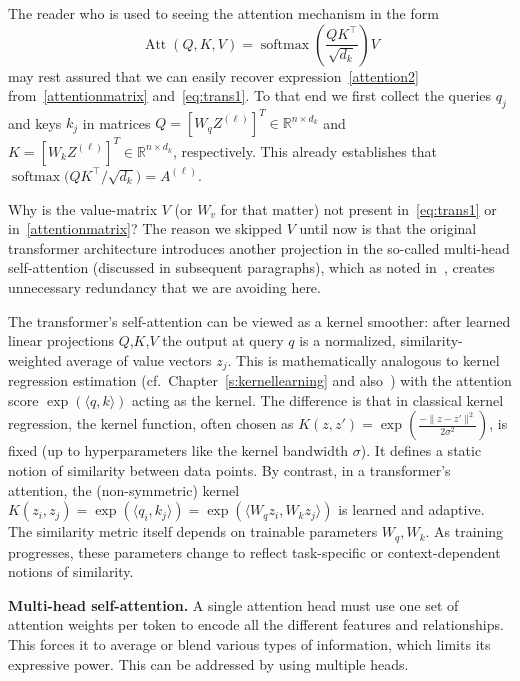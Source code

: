 The reader who is used to seeing the attention mechanism  in the form
\begin{equation}
    \label{attention2}
\operatorname{Att}(Q, K, V) = \operatorname{softmax} \left( \frac{QK^\top}{\sqrt{d_k}} \right)V
\end{equation}
may rest assured that  we can easily recover expression~\eqref{attention2} from~\eqref{attentionmatrix}
and~\eqref{eq:trans1}.
To that end we first collect the queries $q_j$ and keys $k_j$ in matrices $Q = [W_q Z^{(\ell)}]^T \in \mathbb{R}^{n \times d_k}$ and $K =  [W_k Z^{(\ell)}]^T \in \mathbb{R}^{n \times d_k}$, respectively.
This already establishes that $\operatorname{softmax} \big( QK^\top/\sqrt{d_k} \big) = A^{(\ell)}$.

Why is the value-matrix $V$ (or $W_v$ for that matter) not present in~\eqref{eq:trans1} or in~\eqref{attentionmatrix}? The reason we skipped $V$ until now is that the original transformer architecture introduces another projection in the so-called multi-head self-attention (discussed in subsequent paragraphs), which as noted in~\cite{turner2023introduction}, creates unnecessary redundancy that we are avoiding here.

\smallskip

The transformer's self-attention can be viewed as a kernel smoother: after learned linear projections 
$Q$,$K$,$V$ the output at query $q$
is a normalized, similarity-weighted average of value vectors $z_j$.  This is mathematically analogous to  kernel regression estimation (cf.~Chapter~\ref{s:kernellearning} and also~\cite{nadaraya1964estimating,watson1964smooth}) with the attention score 
$\exp (\langle q, k \rangle)$ acting as the  kernel.
The difference is that in classical kernel regression, the kernel function, often chosen as $K(z,z') = \exp(\frac{-\|z-z'\|^2}{2\sigma^2})$, is fixed (up to hyperparameters like the kernel bandwidth $\sigma$). It defines a static notion of similarity between data points. By contrast, in a transformer’s attention, the (non-symmetric) kernel $K(z_i,z_j)=\exp(\langle q_i, k_j \rangle)=\exp(\langle W_q z_i , W_k z_j\rangle)$
is learned and adaptive. The similarity metric itself depends on trainable parameters $W_q, W_k$.
As training progresses, these parameters change to reflect task-specific or context-dependent notions of similarity.


\medskip
\noindent
\textbf{Multi-head self-attention.}
A single attention head must use one set of attention weights per token to encode all the different features and relationships. This forces it to average or blend various types of information, which limits its expressive power. This can be addressed by using multiple heads.

